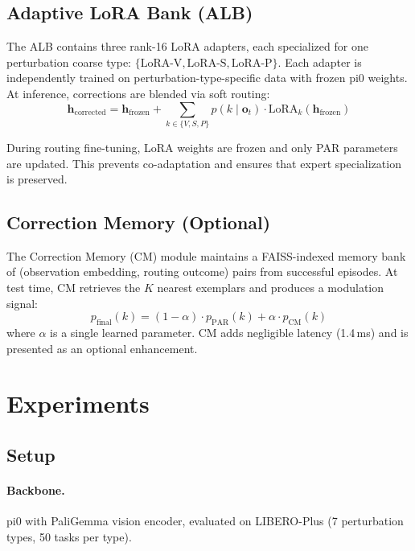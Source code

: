 \documentclass[letterpaper]{article}
\begin{document}
\subsection{Adaptive LoRA Bank (ALB)}

The ALB contains three rank-16 LoRA adapters, each specialized for one perturbation coarse type:
$\{\text{LoRA-V}, \text{LoRA-S}, \text{LoRA-P}\}$.
Each adapter is independently trained on perturbation-type-specific data with frozen pi0 weights.
At inference, corrections are blended via soft routing:
\begin{equation}
  \mathbf{h}_{\text{corrected}} = \mathbf{h}_{\text{frozen}} + \sum_{k \in \{V,S,P\}} p(k \mid \mathbf{o}_t) \cdot \text{LoRA}_k(\mathbf{h}_{\text{frozen}})
\end{equation}

During routing fine-tuning, LoRA weights are frozen and only PAR parameters are updated.
This prevents co-adaptation and ensures that expert specialization is preserved.

\subsection{Correction Memory (Optional)}

The Correction Memory (CM) module maintains a FAISS-indexed memory bank of (observation embedding, routing outcome) pairs from successful episodes.
At test time, CM retrieves the $K$ nearest exemplars and produces a modulation signal:
\begin{equation}
  p_{\text{final}}(k) = (1 - \alpha) \cdot p_{\text{PAR}}(k) + \alpha \cdot p_{\text{CM}}(k)
\end{equation}
where $\alpha$ is a single learned parameter.
CM adds negligible latency (1.4\,ms) and is presented as an optional enhancement.

\section{Experiments}

\subsection{Setup}

\paragraph{Backbone.} pi0 with PaliGemma vision encoder, evaluated on LIBERO-Plus (7 perturbation types, 50 tasks per type).
\end{document}
